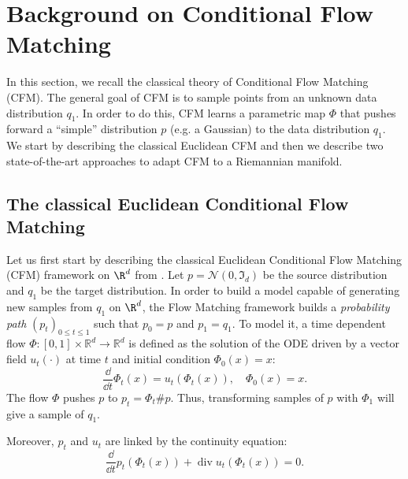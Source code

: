 \documentclass[10pt]{article} %
\theoremstyle{plain}
\theoremstyle{definition}
\theoremstyle{remark}
\begin{document}
\section{Background on Conditional Flow Matching}
\label{sec:background_CFM}
In this section, we recall the classical theory of Conditional Flow Matching (CFM). The general goal of CFM is to sample points from an unknown data distribution $q_1$. In order to do this, CFM learns a parametric map $\Phi$ that pushes forward a ``simple'' distribution $p$ (e.g. a Gaussian) to the data distribution $q_1$. We start by describing the classical Euclidean CFM and then we describe two state-of-the-art approaches to adapt CFM to a Riemannian manifold.

\subsection{The classical Euclidean Conditional Flow Matching}
\label{sec:euc_CFM}
Let us first start by describing the classical Euclidean Conditional Flow Matching (CFM) framework on $\R^d$ from \citet{lipmanFlowMatchingGenerative2023}. Let $p=\mathcal{N}(0,\Im_d)$ be the source distribution and $q_1$ be the target distribution. In order to build a model capable of generating new samples from $q_1$ on $\R^d$, the Flow Matching framework builds a \emph{probability path} $(p_t)_{0 \leq t \leq 1}$ such that $p_0 = p$ and $p_1 = q_1$. To model it, a time dependent flow $\Phi: [0,1] \times \mathbb{R}^d \longrightarrow \mathbb{R}^d$ is defined as the solution of the ODE driven by a vector field $u_t(\cdot)$ at time $t$ and initial condition $\Phi_0(x) = x$:
\begin{equation}
  \label{eq:ODE}
  \frac{\dd}{\dd t}\Phi_t(x) = u_t\!\left(\Phi_t(x)\right), \quad \Phi_0(x) = x.
\end{equation}
The flow $\Phi$ pushes $p$ to $p_t=\Phi_t \# p$. Thus, transforming samples of $p$ with $\Phi_1$ will give a sample of $q_1$.

Moreover, $p_t$ and $u_t$ are linked by the continuity equation:
\begin{equation}
  \frac{\dd}{\dd t} p_t\left(\Phi_t(x)\right) + \operatorname{div}u_t\left(\Phi_t(x)\right) = 0.
  \label{eq:continuity_eq}
\end{equation}
\end{document}
